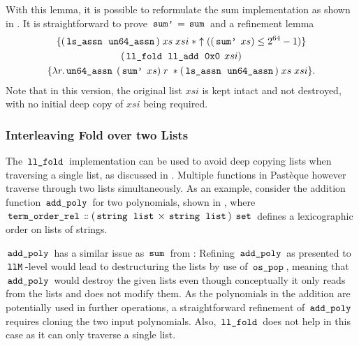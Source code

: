 With this lemma, it is possible to reformulate the sum implementation as shown in .
It is straightforward to prove $\,\text{\ttfamily sum'}\, = \,\text{\ttfamily sum}\,$ and a refinement lemma
\begin{gather*}
	\{(\,\text{\ttfamily ls\_assn}\, \; \,\text{\ttfamily un64\_assn}\,) \; xs \; xsi \; \ast \uparrow((\,\text{\ttfamily sum'}\, \; xs) \le 2^{64}-1)\} \\
	(\,\text{\ttfamily ll\_fold}\, \; \,\text{\ttfamily ll\_add}\, \; \,\text{\ttfamily 0x0}\, \; xsi) \\
	\{\lambda r. \,\text{\ttfamily un64\_assn}\, \; (\,\text{\ttfamily sum'}\, \; xs) \; r \; \ast (\,\text{\ttfamily ls\_assn}\, \; \,\text{\ttfamily un64\_assn}\,) \; xs \; xsi\}.
\end{gather*}
Note that in this version, the original list $xsi$ is kept intact and not destroyed, with no initial deep copy of $xsi$ being required.

\subsubsection{Interleaving Fold over two Lists}\label{sec:interleaving-fold}

The $\,\text{\ttfamily ll\_fold}\,$ implementation can be used to avoid deep copying lists when traversing a single list, as discussed in .
Multiple functions in Pastèque however traverse through two lists simultaneously.
As an example, consider the addition function $\,\text{\ttfamily add\_poly}\,$ for two polynomials, shown in , where $\,\text{\ttfamily term\_order\_rel}\, \mathrel{\mathord{:}\mkern-1.2mu\mathord{:}} (\,\text{\ttfamily string}\, \; \,\text{\ttfamily list}\, \times \,\text{\ttfamily string}\, \; \,\text{\ttfamily list}\,) \; \,\text{\ttfamily set}\,$ defines a lexicographic order on lists of strings.

$\,\text{\ttfamily add\_poly}\,$ has a similar issue as $\,\text{\ttfamily sum}\,$ from :
Refining $\,\text{\ttfamily add\_poly}\,$ as presented to $\,\text{\ttfamily llM}\,$-level would lead to destructuring the lists by use of $\,\text{\ttfamily os\_pop}\,$, meaning that $\,\text{\ttfamily add\_poly}\,$ would destroy the given lists even though conceptually it only reads from the lists and does not modify them.
As the polynomials in the addition are potentially used in further operations, a straightforward refinement of $\,\text{\ttfamily add\_poly}\,$ requires cloning the two input polynomials.
Also, $\,\text{\ttfamily ll\_fold}\,$ does not help in this case as it can only traverse a single list.

